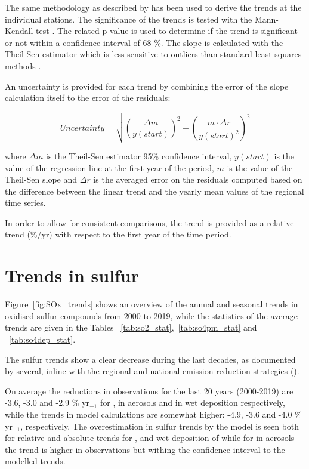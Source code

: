 The same methodology as described by \cite{aas2019global, mortier2020} has been used to derive the trends at the individual stations. The significance of the trends is tested with the Mann-Kendall test \citep{hamed1998modified}. The related p-value is used to determine if the trend is significant or not within a confidence interval of 68 \%. The slope is calculated with the Theil-Sen estimator which is less sensitive to outliers than standard least-squares methods \citep{sen1968estimates}.

An uncertainty is provided for each trend by combining the error of the slope calculation itself to the error of the residuals:

\begin{equation}
 Uncertainty = \sqrt{{\left (\frac{\Delta m}{y(start)}\right )}^{2} + {\left ( \frac{m \cdot \Delta r}{y(start)^2}\right )}^{2} }
\end{equation}

where $\Delta m$ is the Theil-Sen estimator 95\% confidence interval, $y(start)$ is the value of the regression line at the first year of the period, $m$ is the value of the Theil-Sen slope and $\Delta r$ is the averaged error on the residuals computed based on the difference between the linear trend and the yearly mean values of the regional time series.

In order to allow for consistent comparisons, the trend is provided as a relative trend (\%/yr) with respect to the first year of the time period.



\section{\label{sec:Trends_sulfur}Trends in sulfur}

Figure~\ref{fig:SOx_trends} shows an overview of the annual and seasonal trends in oxidised sulfur compounds from 2000 to 2019, while the statistics of the average trends are given in the Tables ~\ref{tab:so2_stat},~\ref{tab:so4pm_stat} and ~\ref{tab:so4dep_stat}.

The sulfur trends show a clear decrease during the last decades, as documented by several, inline with the regional and national emission reduction strategies (\cite{aas2019global, Colette2012, Vivanco2018, Theobald2019, Colette2021, Banzhaf2015, torseth2012, Crippa2016}).

On average the reductions in observations for the last 20 years (2000-2019) are -3.6, -3.0 and -2.9  \% yr$_{-1}$ for \soii, \soiv in aerosols and in wet deposition respectively, while the trends in model calculations are somewhat higher: -4.9, -3.6 and -4.0 \% yr$_{-1}$, respectively. The overestimation in sulfur trends by the model is seen both for relative and absolute trends for \soii, and wet deposition of \soiv while for \soiv in aerosols the trend is higher in observations but withing the confidence interval to the modelled trends. 



